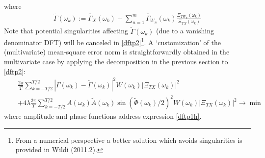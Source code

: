 \documentclass[11pt]{article}
\begin{document}
where
\begin{eqnarray}\label{dftp1h}
\tilde{\Gamma}(\omega_k):=\hat{\Gamma}_X(\omega_k)+\sum_{n=1}^m
\hat{\Gamma}_{W_n}(\omega_k)\frac{\Xi_{TW_n}(\omega_k)}{\Xi_{T
X}(\omega_k)}
\end{eqnarray}
Note that potential singularities affecting $\tilde{\Gamma}(\omega_k)$ (due to a vanishing denominator DFT) will be canceled in \ref{dftp2}\footnote{From a numerical perspective a better solution which avoids singularities is provided in Wildi (2011.2).}. A `customization' of the (multivariate) mean-square error norm is straightforwardly obtained in the multivariate case by applying the decomposition in the previous section to \ref{dftp2}:
\begin{eqnarray} &&
\frac{2\pi}{T} \sum_{k=-T/2}^{T/2}
|\Gamma(\omega_k)-\tilde{\Gamma}(\omega_k)|^2 W(\omega_k)\left|\Xi_{TX}(\omega_k)\right|^2\nonumber\\
&&+4\lambda\frac{2\pi}{ T} \sum_{k=-T/2}^{T/2}
A(\omega_k)\tilde{A}(\omega_k)\sin(\tilde{\Phi}(\omega_k)/2)^2
W(\omega_k)\left|\Xi_{TX}(\omega_k)\right|^2\to\min\label{dfatpmulti}
\end{eqnarray}
where amplitude and phase functions address expression \ref{dftp1h}. \\
\end{document}
